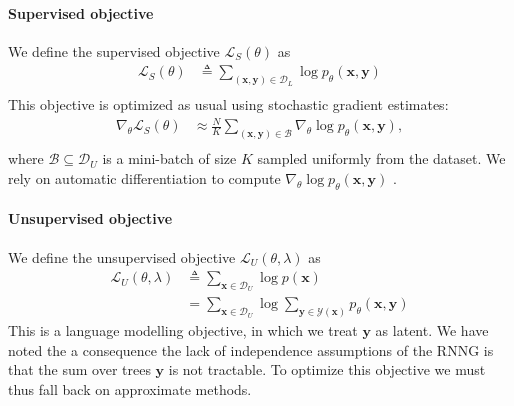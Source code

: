 \paragraph{Supervised objective}
We define the supervised objective $\mathcal{L}_{S}(\theta)$ as
\begin{align*}
  \mathcal{L}_{S}(\theta)
    &\triangleq \sum_{(\mathbf{x}, \mathbf{y}) \in \mathcal{D}_L} \log p_{\theta} (\mathbf{x}, \mathbf{y}) \\
\end{align*}
This objective is optimized as usual using stochastic gradient estimates:
\begin{align*}
  \nabla_{\theta} \mathcal{L}_{S}(\theta)
    &\approx \frac{N}{K} \sum_{(\mathbf{x}, \mathbf{y}) \in \mathcal{B}} \nabla_{\theta} \log p_{\theta} (\mathbf{x}, \mathbf{y}), \\
\end{align*}
where $\mathcal{B} \subseteq \mathcal{D}_U$ is a mini-batch of size $K$ sampled uniformly from the dataset. We rely on automatic differentiation to compute $\nabla_{\theta} \log p_{\theta}(\mathbf{x}, \mathbf{y})$ \citep{Baydin+2017:AD}.

\paragraph{Unsupervised objective}
We define the unsupervised objective $\mathcal{L}_{U}(\theta, \lambda)$ as
\begin{subequations}
\begin{align*}
  \mathcal{L}_{U}(\theta, \lambda)
    &\triangleq \sum_{\mathbf{x} \in \mathcal{D}_U} \log p (\mathbf{x}) \\
    &= \sum_{\mathbf{x} \in \mathcal{D}_U} \log \sum_{ \mathbf{y} \in \mathcal{Y}(\mathbf{x})} p_{\theta}(\mathbf{x}, \mathbf{y})
\end{align*}
\end{subequations}
This is a language modelling objective, in which we treat $\mathbf{y}$ as latent. We have noted the a consequence the lack of independence assumptions of the RNNG is that the sum over trees $\mathbf{y}$ is not tractable. To optimize this objective we must thus fall back on approximate methods.

